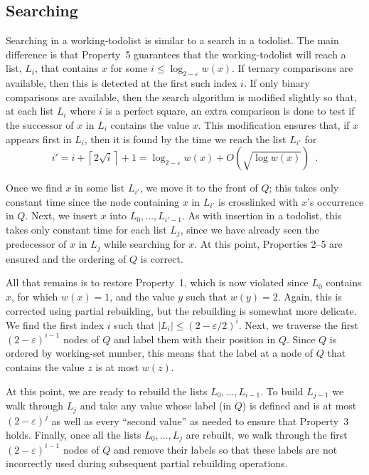 \documentclass[lotsofwhite]{patmorin}
\newcommand{\eps}{\varepsilon}
\begin{document}
\subsection{Searching}

Searching in a working-todolist is similar to a search in a todolist.
The main
difference is that Property~5 guarantees that the working-todolist will reach
a list, $L_i$, that contains $x$ for some $i\le\log_{2-\eps} w(x)$.
If ternary comparisons are available, then this is detected at the
first such index $i$.  If only binary comparisons are available, then
the search algorithm is modified slightly so that, at each list $L_i$
where $i$ is a perfect square, an extra comparison is done to test if
the successor of $x$ in $L_i$ contains the value $x$.  This modification
ensures that, if $x$ appears first in $L_i$, then it is found by the
time we reach the list $L_{i'}$ for
\[
     i'=i+\left\lceil 2\sqrt{i}\right\rceil + 1 = \log_{2-\eps} w(x) + O(\sqrt{\log w(x)}) \enspace .
\]

Once we find $x$ in some list $L_{i'}$, we move it to the front of $Q$;
this takes only constant time since the node containing $x$ in $L_{i'}$
is crosslinked with $x$'s occurrence in $Q$.  Next, we insert $x$ into
$L_0,\ldots,L_{i'-1}$.  As with insertion in a todolist, this takes only
constant time for each list $L_j$, since we have already seen the predecessor
of $x$ in $L_j$ while searching for $x$.  
At this point, Properties 2--5 are ensured and the ordering of $Q$ is
correct.  

All that remains is to restore Property~1, which is now violated
since $L_0$ contains $x$, for which $w(x)=1$, and the value $y$ such
that $w(y)=2$.  Again, this is corrected using partial rebuilding,
but the rebuilding is somewhat more delicate.  We find the first index
$i$ such that $|L_i|\le (2-\eps/2)^i$.  Next, we traverse the first
$(2-\eps)^{i-1}$ nodes of $Q$ and label them with their position in $Q$.
Since $Q$ is ordered by working-set number, this means that the label
at a node of $Q$ that contains the value $z$ is at most $w(z)$.

At this point, we are ready to rebuild the lists $L_0,\ldots,L_{i-1}$. To
build $L_{j-1}$ we walk through $L_j$ and take any value whose label
(in $Q$) is defined and is at most $(2-\eps)^j$ as well as every
``second value'' as needed to ensure that Property~3 holds.  Finally,
once all the lists $L_0,\ldots,L_j$ are rebuilt, we walk through the first
$(2-\eps)^{i-1}$ nodes of $Q$ and remove their labels so that these labels
are not incorrectly used during subsequent partial rebuilding operations.
\end{document}
